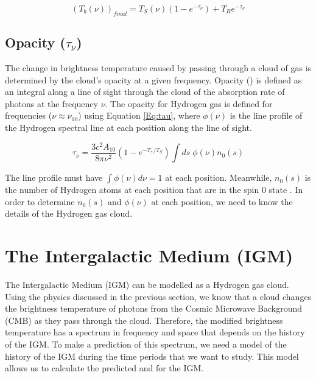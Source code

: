 \begin{equation}\label{Eq:T_bf}
(T_b (\nu))_{final}= T_{S} (\nu) (1-e^{-\tau_\nu}) +T_{R} e^{-\tau_\nu}
\end{equation}



\subsection{Opacity ($\tau_\nu$)}

The change in brightness temperature caused by passing through a cloud of gas is determined by the cloud's opacity at a given frequency. Opacity (\tu) is defined as an integral along a line of sight through the cloud of the absorption rate of photons at the frequency $\nu$. The opacity for Hydrogen gas is defined for frequencies ($\nu \approx \nu_{10}$) using Equation \ref{Eq:tau}, where $\phi (\nu)$ is the line profile of the Hydrogen \cm spectral line at each position along the line of sight.

\begin{equation} \label{Eq:tau}
\tau_{\nu} = \frac{3 c^2 A_{10}}{8 \pi \nu^2 } (1-e^{-T_*/T_S}) \int ds \; \phi (\nu) n_0(s)
\end{equation}

 The line profile must have $\int \phi(\nu) d \nu = 1$ at each position. Meanwhile, $n_0 (s)$ is the number of Hydrogen atoms at each position that are in the spin 0 state \cite{furlanetto_2006}. In order to determine $n_0 (s)$ and $\phi (\nu)$ at each position, we need to know the details of the Hydrogen gas cloud. 



\section{The Intergalactic Medium (IGM)}\label{Sec:IGM}

The Intergalactic Medium (IGM) can be modelled as a Hydrogen gas cloud. Using the physics discussed in the previous section, we know that a cloud changes the brightness temperature of photons from the Cosmic Microwave Background (CMB) as they pass through the cloud. Therefore, the modified brightness temperature has a spectrum in frequency and space that depends on the history of the IGM. To make a prediction of this spectrum, we need a model of the history of the IGM during the time periods that we want to study. This model allows us to calculate the predicted \ts and \tu for the IGM. 


